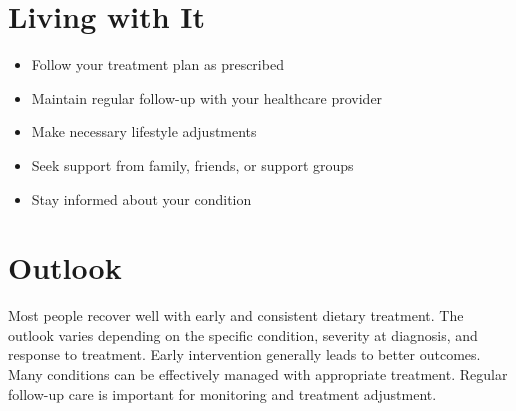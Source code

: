 \section{Living with It}
\begin{itemize}[noitemsep]
  \item Follow your treatment plan as prescribed
  \item Maintain regular follow-up with your healthcare provider
  \item Make necessary lifestyle adjustments
  \item Seek support from family, friends, or support groups
  \item Stay informed about your condition
\end{itemize}
\section{Outlook}
Most people recover well with early and consistent dietary treatment. The outlook varies depending on the specific condition, severity at diagnosis, and response to treatment. Early intervention generally leads to better outcomes. Many conditions can be effectively managed with appropriate treatment. Regular follow-up care is important for monitoring and treatment adjustment.
